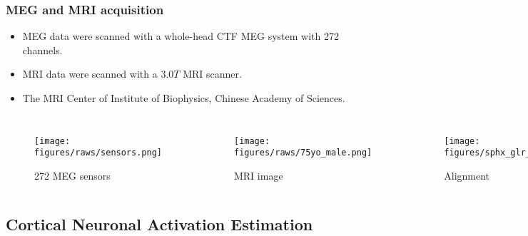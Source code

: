 \documentclass[aspectratio=169]{beamer}
\begin{document}
\begin{frame}
    \frametitle{MEG and MRI acquisition}

    \begin{itemize}
        \item MEG data were scanned with a whole-head CTF MEG system with 272 channels.
        \item MRI data were scanned with a $3.0 T$ MRI scanner.
        \item The MRI Center of Institute of Biophysics, Chinese Academy of Sciences.
    \end{itemize}

    \begin{columns}

        \begin{figure}[h]
            \centering
            \texttt{[image: figures/raws/sensors.png]}
            \caption{272 MEG sensors}
        \end{figure}


        \begin{figure}[h]
            \centering
            \texttt{[image: figures/raws/75yo\_male.png]}
            \caption{MRI image}
        \end{figure}


        \begin{figure}[h]
            \centering
            \texttt{[image: figures/sphx\_glr\_plot\_eeg\_no\_mri\_001.png]}
            \caption{Alignment}
        \end{figure}

    \end{columns}

\end{frame}

\subsection{Cortical Neuronal Activation Estimation}
\end{document}
